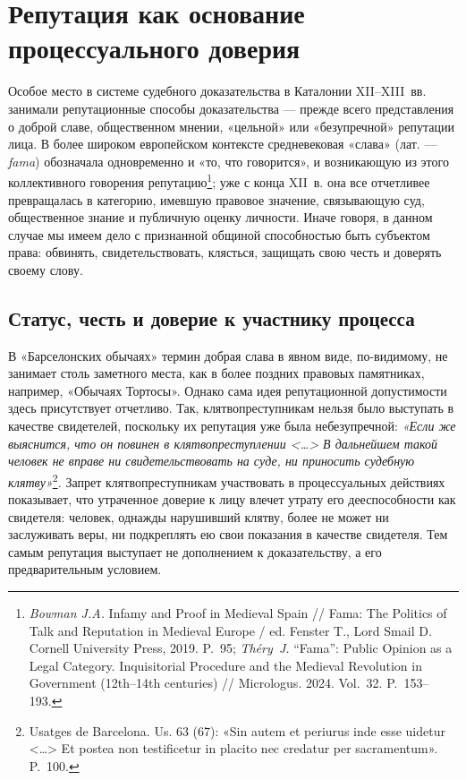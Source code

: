 \section{Репутация как основание процессуального доверия}

Особое место в системе судебного доказательства в Каталонии XII--XIII~вв. занимали репутационные способы доказательства --- прежде всего представления о доброй славе, общественном мнении, «цельной» или «безупречной» репутации лица. В более широком европейском контексте средневековая «слава» (лат. --- \emph{fama}) обозначала одновременно и «то, что говорится», и возникающую из этого коллективного говорения репутацию\footnote{\emph{Bowman J.A.} Infamy and Proof in Medieval Spain // Fama: The Politics of Talk and Reputation in Medieval Europe / ed. Fenster T., Lord Smail D. Cornell University Press, 2019. P.~95; \emph{Théry}\emph{~}\emph{J. }“Fama”: Public Opinion as a Legal Category. Inquisitorial Procedure and the Medieval Revolution in Government (12th--14th centuries) // Micrologus. 2024. Vol.~32. P.~153--193.}; уже с конца XII~в. она все отчетливее превращалась в категорию, имевшую правовое значение, связывающую суд, общественное знание и публичную оценку личности. Иначе говоря, в данном случае мы имеем дело с признанной общиной способностью быть субъектом права: обвинять, свидетельствовать, клясться, защищать свою честь и доверять своему слову.

\subsection{Статус, честь и доверие к участнику процесса}

В «Барселонских обычаях» термин добрая слава в явном виде, по-видимому, не занимает столь заметного места, как в более поздних правовых памятниках, например, «Обычаях Тортосы». Однако сама идея репутационной допустимости здесь присутствует отчетливо. Так, клятвопреступникам нельзя было выступать в качестве свидетелей, поскольку их репутация уже была небезупречной: \emph{«Если же выяснится, что он повинен в клятвопреступлении <…> В дальнейшем такой человек не вправе ни свидетельствовать на суде, ни приносить судебную клятву»}\footnote{Usatges de Barcelona. Us. 63 (67): «Sin autem et periurus inde esse uidetur <…> Et postea non testificetur in placito nec credatur per sacramentum». P.~100.}\emph{.} Запрет клятвопреступникам участвовать в процессуальных действиях показывает, что утраченное доверие к лицу влечет утрату его дееспособности как свидетеля: человек, однажды нарушивший клятву, более не может ни заслуживать веры, ни подкреплять ею свои показания в качестве свидетеля. Тем самым репутация выступает не дополнением к доказательству, а его предварительным условием.


